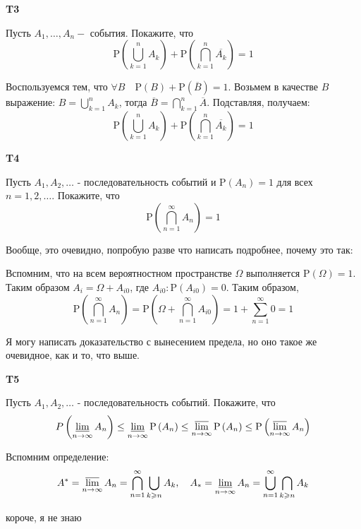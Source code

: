 \documentclass[a4paper,12pt]{article} %
\begin{document}
\begin{example}\textbf{T3}

Пусть $A_{1}, \ldots, A_{n}-$ события. Покажите, что
$$
\mathrm{P}\left(\bigcup_{k=1}^{n} A_{k}\right)+\mathrm{P}\left(\bigcap_{k=1}^{n} \overline{A_{k}}\right)=1
$$

Воспользуемся тем, что $\forall B \quad \mathrm{P}(B)+\mathrm{P}(\overline{B})=1$. 
Возьмем в качестве $B$ выражение: $B=\bigcup_{k=1}^n A_k$, тогда 
$\overline{B}=\bigcap_{k=1}^n\overline{A}$.
Подставляя, получаем:
$$
\mathrm{P}\left(\bigcup_{k=1}^{n} A_{k}\right)+\mathrm{P}\left(\bigcap_{k=1}^{n} \overline{A_{k}}\right)=1
$$


\end{example}




\begin{example}\textbf{T4}

Пусть $A_{1}, A_{2}, \ldots$ - последовательность событий и $\mathrm{P}\left(A_{n}\right)=1$ для всех $n=1,2, \ldots .$ Покажите, что
$$
\mathrm{P}\left(\bigcap_{n=1}^{\infty} A_{n}\right)=1
$$

Вообще, это очевидно, попробую разве что написать подробнее, почему это так:

Вспомним, что на всем вероятностном пространстве $\Omega$ выполняется $ \mathrm{P}(\Omega)=1.$ 
Таким образом $A_i=\Omega+A_{i0}$, где $ A_{i0}: \mathrm{P}(A_{i0})=0$.
Таким образом, 
$$
\mathrm{P}\left(\bigcap_{n=1}^{\infty} A_{n}\right)=
\mathrm{P}\left(\Omega+\bigcap_{n=1}^{\infty} A_{i0}\right)=
1+\sum_{n=1}^{\infty} 0=1
$$

Я могу написать доказательство с вынесением предела, но оно такое же очевидное, как и то, что выше.


\end{example}


\begin{example}\textbf{T5}

Пусть $A_{1}, A_{2}, \ldots$ - последовательность событий. Покажите, что
$$
P\left(\varliminf_{n \rightarrow \infty} A_{n}\right) \leq 
\varliminf_{n \rightarrow \infty} \mathrm{P}\left(A_{n}\right) \leq 
\varlimsup_{n \rightarrow \infty} \mathrm{P}\left(A_{n}\right) \leq 
\mathrm{P}\left(\varlimsup_{n \rightarrow \infty} A_{n}\right)
$$

Вспомним определение:
\[ 
A^{*}=\varlimsup_{n \rightarrow \infty} A_{n}=
\bigcap_{n=1}^{\infty} \bigcup_{k \geqslant n} A_{k}, \quad 
A_{*}=\varliminf_{n \rightarrow \infty} A_{n}=\bigcup_{n=1}^{\infty} \bigcap_{k \geqslant n} A_{k} 
\]


короче, я не знаю




\end{example}
\end{document}
